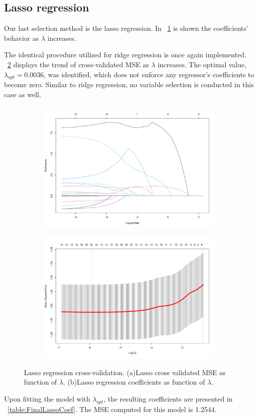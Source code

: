 \subsection{Lasso regression}

Our last selection method is the lasso regression. In \Fig~\ref{fig:LassoCoefVsLambda} is shown the coefficients' behavior as $\lambda$ increases. 

The identical procedure utilized for ridge regression is once again implemented. \Fig~\ref{fig:LassoCvPlot} displays the trend of cross-validated MSE as $\lambda$ increases. The optimal value, $\lambda_{opt} = 0.0036$, was identified, which does not enforce any regressor's coefficients to become zero. Similar to ridge regression, no variable selection is conducted in this case as well.

\begin{figure}[H]
	\centering
	\begin{subfigure}{.5\textwidth}
		\centering
		\includegraphics[width=0.7\linewidth]{ImageFiles/Regression/Lasso/LassoCoefVsLambda.pdf}
		\caption{}
		\label{fig:LassoCoefVsLambda}
	\end{subfigure}%
	\begin{subfigure}{.5\textwidth}
		\centering
		\includegraphics[width=0.7\linewidth]{ImageFiles/Regression/Lasso/LassoCvPlot.pdf}
		\caption{}
		\label{fig:LassoCvPlot}
	\end{subfigure}	
	\caption{Lasso regression cross-validation. (a)Lasso cross validated MSE as function of $\lambda$. (b)Lasso regression coefficients as function of $\lambda$.}
	\label{fig:FinalFSSM}
\end{figure}

Upon fitting the model with $\lambda_{opt}$, the resulting coefficients are presented in \Tab~\ref{table:FinalLassoCoef}. The MSE computed for this model is 1.2544.

